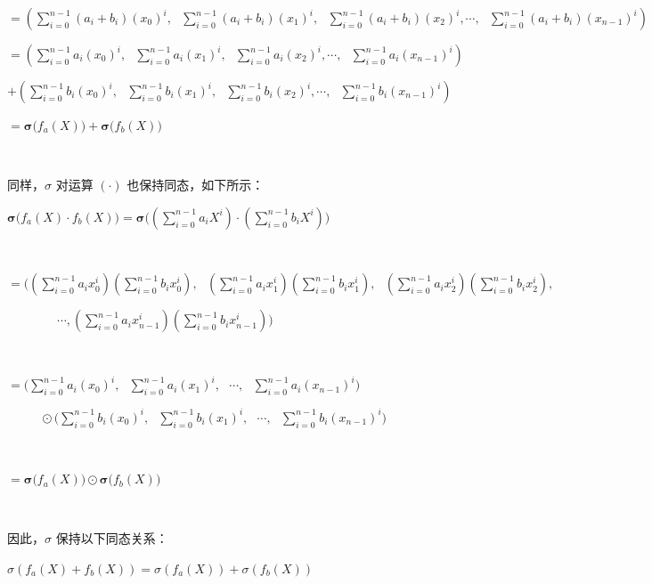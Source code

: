 $= \left(\sum\limits_{i=0}^{n-1}(a_i + b_i)(x_0)^i, \text{ }\sum\limits_{i=0}^{n-1}(a_i + b_i)(x_1)^i, \text{ }\sum\limits_{i=0}^{n-1}(a_i + b_i)(x_2)^i, \cdots, \text{ }\sum\limits_{i=0}^{n-1}(a_i + b_i)(x_{n-1})^i\right)$

$= \left(\sum\limits_{i=0}^{n-1}a_i(x_0)^i, \text{ }\sum\limits_{i=0}^{n-1}a_i(x_1)^i, \text{ }\sum\limits_{i=0}^{n-1}a_i(x_2)^i, \cdots, \text{ } \sum\limits_{i=0}^{n-1}a_i(x_{n-1})^i\right)$

\text{ } $+ \left(\sum\limits_{i=0}^{n-1}b_i(x_0)^i, \text{ } \sum\limits_{i=0}^{n-1}b_i(x_1)^i, \text{ } \sum\limits_{i=0}^{n-1}b_i(x_2)^i, \cdots, \text{ } \sum\limits_{i=0}^{n-1}b_i(x_{n-1})^i\right)$

$= \bm{\sigma(}f_a(X)\bm{)} + \bm{\sigma(}f_b(X)\bm{)}$

$ $

同样，$\sigma$ 对运算 $(\cdot)$ 也保持同态，如下所示：


$\bm{\sigma(}f_a(X)\cdot f_b(X)\bm{)} = \bm{\sigma\bigg(}\left(\sum\limits_{i=0}^{n-1}a_iX^i\right)\cdot\left( \sum\limits_{i=0}^{n-1}b_iX^i\right)\bm{\bigg)}$

$ $

$= \Bigg( \left(\sum\limits_{i=0}^{n-1}a_ix_0^i\right)\left( \sum\limits_{i=0}^{n-1}b_ix_0^i\right), \text{ }
\left(\sum\limits_{i=0}^{n-1}a_ix_1^i\right)\left( \sum\limits_{i=0}^{n-1}b_ix_1^i\right), \text{ }
\left(\sum\limits_{i=0}^{n-1}a_ix_2^i\right)\left( \sum\limits_{i=0}^{n-1}b_ix_2^i\right),$

$  \text{ } \text{ } \text{ } \text{ } \text{ } \text{ }
\cdots,
\left(\sum\limits_{i=0}^{n-1}a_ix_{n-1}^i\right)\left( \sum\limits_{i=0}^{n-1}b_ix_{n-1}^i\right)
\Bigg)$

$ $

$ = \Bigg(\sum\limits_{i=0}^{n-1}a_i(x_0)^i, \text{ } \sum\limits_{i=0}^{n-1}a_i(x_1)^i, \text{ } \cdots, \text{ } \sum\limits_{i=0}^{n-1}a_i(x_{n-1})^i\Bigg)$

$  \text{ } \text{ } \text{ } \text{ }  \odot  \Bigg(\sum\limits_{i=0}^{n-1}b_i(x_0)^i, \text{ } 
\sum\limits_{i=0}^{n-1}b_i(x_1)^i, \text{ }
\cdots, \text{ } \sum\limits_{i=0}^{n-1}b_i(x_{n-1})^i\Bigg)$

$ $

$= \bm{\sigma(}f_a(X)\bm{)} \odot \bm{\sigma(}f_b(X)\bm{)}$

$ $

因此，$\sigma$ 保持以下同态关系：

$\sigma(f_a(X) + f_b(X)) = \sigma(f_a(X)) + \sigma(f_b(X))$

